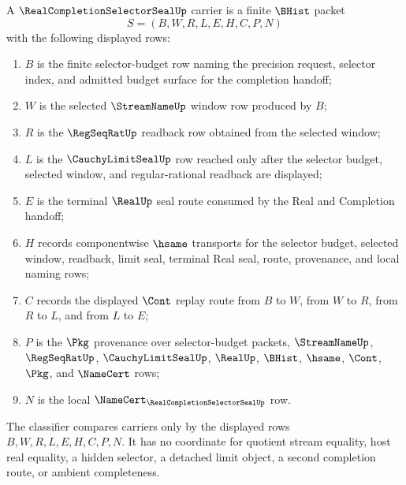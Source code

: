 \begin{definition}
\label{def:real-completion-selector-seal-carrier}
A $\RealCompletionSelectorSealUp$ carrier is a finite $\BHist$ packet
$$
S=(B,W,R,L,E,H,C,P,N)
$$
with the following displayed rows:
\begin{enumerate}
\item $B$ is the finite selector-budget row naming the precision request, selector index, and admitted budget surface for the completion handoff;
\item $W$ is the selected $\StreamNameUp$ window row produced by $B$;
\item $R$ is the $\RegSeqRatUp$ readback row obtained from the selected window;
\item $L$ is the $\CauchyLimitSealUp$ row reached only after the selector budget, selected window, and regular-rational readback are displayed;
\item $E$ is the terminal $\RealUp$ seal route consumed by the Real and Completion handoff;
\item $H$ records componentwise $\hsame$ transports for the selector budget, selected window, readback, limit seal, terminal Real seal, route, provenance, and local naming rows;
\item $C$ records the displayed $\Cont$ replay route from $B$ to $W$, from $W$ to $R$, from $R$ to $L$, and from $L$ to $E$;
\item $P$ is the $\Pkg$ provenance over selector-budget packets, $\StreamNameUp$, $\RegSeqRatUp$, $\CauchyLimitSealUp$, $\RealUp$, $\BHist$, $\hsame$, $\Cont$, $\Pkg$, and $\NameCert$ rows;
\item $N$ is the local $\NameCert_{\RealCompletionSelectorSealUp}$ row.
\end{enumerate}
The classifier compares carriers only by the displayed rows $B,W,R,L,E,H,C,P,N$. It has no coordinate for quotient stream equality, host real equality, a hidden selector, a detached limit object, a second completion route, or ambient completeness.
\end{definition}

